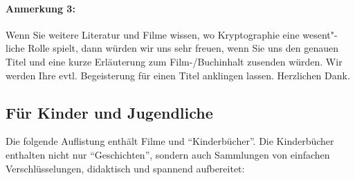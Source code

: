 \paragraph*{Anmerkung 3:}
Wenn Sie weitere Literatur und Filme wissen, wo Kryptographie eine
wesent"-liche Rolle spielt, dann würden wir uns sehr freuen, wenn Sie
uns den genauen Titel und eine kurze Erläuterung zum Film-/Buchinhalt
zusenden würden. Wir werden Ihre evtl. Begeisterung für einen Titel
anklingen lassen. Herzlichen Dank.





\subsection{Für Kinder und Jugendliche}

Die folgende Auflistung enthält Filme und "`Kinderbücher"'.
Die Kinderbücher enthalten nicht nur "`Geschichten"', sondern auch Sammlungen von
einfachen Verschlüsselungen, didaktisch und spannend aufbereitet:

